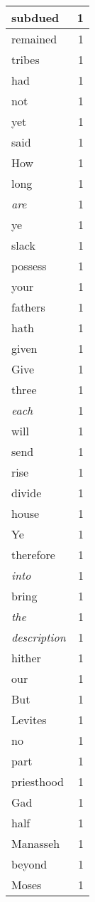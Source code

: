 \begin{center}
\begin{longtable}{l|r}
subdued & 1\\ \hline 
remained & 1\\ \hline 
tribes & 1\\ \hline 
had & 1\\ \hline 
not & 1\\ \hline 
yet & 1\\ \hline 
said & 1\\ \hline 
How & 1\\ \hline 
long & 1\\ \hline 
\emph{are} & 1\\ \hline 
ye & 1\\ \hline 
slack & 1\\ \hline 
possess & 1\\ \hline 
your & 1\\ \hline 
fathers & 1\\ \hline 
hath & 1\\ \hline 
given & 1\\ \hline 
Give & 1\\ \hline 
three & 1\\ \hline 
\emph{each} & 1\\ \hline 
will & 1\\ \hline 
send & 1\\ \hline 
rise & 1\\ \hline 
divide & 1\\ \hline 
house & 1\\ \hline 
Ye & 1\\ \hline 
therefore & 1\\ \hline 
\emph{into} & 1\\ \hline 
bring & 1\\ \hline 
\emph{the} & 1\\ \hline 
\emph{description} & 1\\ \hline 
hither & 1\\ \hline 
our & 1\\ \hline 
But & 1\\ \hline 
Levites & 1\\ \hline 
no & 1\\ \hline 
part & 1\\ \hline 
priesthood & 1\\ \hline 
Gad & 1\\ \hline 
half & 1\\ \hline 
Manasseh & 1\\ \hline 
beyond & 1\\ \hline 
Moses & 1\\ \hline 

\end{longtable}
\end{center}
